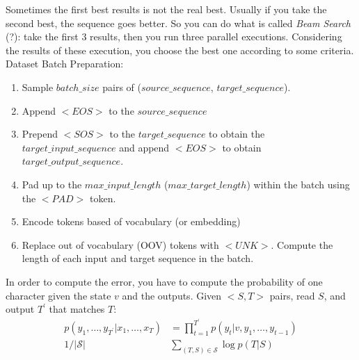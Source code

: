 
Sometimes the first best results is not the real best. Usually if you take the second best, the sequence goes better. So you can do what is called \textit{Beam Search} (?): take the first 3 results, then you run three parallel executions. Considering the results of these execution, you choose the best one according to some criteria. \\


Dataset Batch Preparation:
\begin{enumerate}
    \item Sample $batch\_size$ pairs of ($source\_sequence$, $target\_sequence$).
    \item  Append $<EOS>$ to the $source\_sequence$
    \item Prepend $<SOS>$ to the $target\_sequence$ to obtain the $target\_input\_sequence$ and append $<EOS>$ to obtain $target\_output\_sequence$.
    \item  Pad up to the $max\_input\_length$ ($max\_target\_length$) within the batch using the $<PAD>$ token.
    \item Encode tokens based of vocabulary (or embedding)
    \item Replace out of vocabulary (OOV) tokens with $<UNK>$. Compute the length of each input and target sequence in the batch.
\end{enumerate}{}




In order to compute the error, you have to compute the probability of one character given the state $v$ and the outputs. Given $<S, T>$ pairs, read $S$, and output $T^{\prime}$ that matches $T$: 
$$
\begin{aligned}
p\left(y_{1}, \ldots, y_{T^{\prime}} | x_{1}, \ldots, x_{T}\right) &=\prod_{t=1}^{T^{\prime}} p\left(y_{t} | v, y_{1}, \ldots, y_{t-1}\right) \\
1 /|\mathcal{S}| & \sum_{(T, S) \in \mathcal{S}} \log p(T | S)
\end{aligned}
$$

